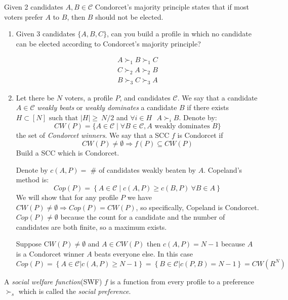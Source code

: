 \documentclass[a4paper,11pt]{exam}
\begin{document}
\begin{questions}
\question
Given 2 candidates $A,B\in \mathcal{C}$ Condorcet's majority principle states that if most voters prefer $ A $ to $ B $, then $ B $ should not be elected.
\begin{enumerate}
	\item Given 3 candidates $\{A,B,C\}$, can you build a profile in which no candidate can be elected according to Condorcet's majority principle?
	\begin{solution}
	\[
		\begin{array}{c}
		A\succ_1 B\succ_1 C\\
		C\succ_2 A\succ_2 B\\
		B\succ_3 C\succ_3 A
		\end{array}
	\]
	\end{solution}
	\item Let there be $N$ voters, a profile $P$, and candidates $\mathcal{C}$. We say that a candidate $A\in\mathcal{C}$ \emph{weakly beats} or \emph{weakly dominates} a candidate $B$ if there exists $ H\subset [N] \text{ such that } |H|\geq~N/2$   and  $ \forall i\in H \text{ }  A\succ_i B$. Denote by:
	\[
		CW(P)=\{A\in\mathcal{C}\mid \forall B\in \mathcal{C}, A\text{ weakly dominates } B \}
	\]
	 the set of \emph{Condorcet winners}. We say that a SCC $f$ is Condorcet if 
	 \[ 
	 	CW(P)\neq\emptyset \Rightarrow f(P)\subseteq CW(P)
	 \]
	 Build a SCC which is Condorcet.
	 \begin{solution}
	 	Denote by $c\left(A,P\right)=$ \# of candidates weakly beaten by $A$. Copeland's method is:
	 	\[
	 		Cop\left(P\right)=\left\{ A\in \mathcal{C} \mid c\left(A,P\right)\ge c\left(B,P\right)\ \forall B\in A\right\} 
	 	\]
		We will show that for any profile $P$ we have $ CW\left(P\right)\ne\emptyset \Rightarrow Cop\left(P\right)=CW\left(P\right) $, so specifically, Copeland is Condorcet.
		$ Cop\left(P\right)\ne\emptyset $ because the count for a candidate and the number of candidates are both finite, so a maximum exists.
	 	
		Suppose C$ W\left(P\right)\ne\emptyset $ and 
		$ A\in CW\left(P\right)$ then $ c\left(A,P\right)=N-1 $ 
		because $A$ is a Condorcet winner $ A$ beats everyone else. 
		In this case $Cop\left(P\right)=\left\{ A\in \mathcal{C}\vert c\left(A,P\right)\ge N-1\right\} =\left\{ B\in \mathcal{C}\vert c\left(P,B\right)=N-1\right\} =CW\left(R^{N}\right) $
	 \end{solution}
\end{enumerate} 

A \emph{social welfare function}(SWF) $f$ is a function from every profile to a preference $\succ_s$ which is called the \emph{social preference}. 


\end{questions}
\end{document}
